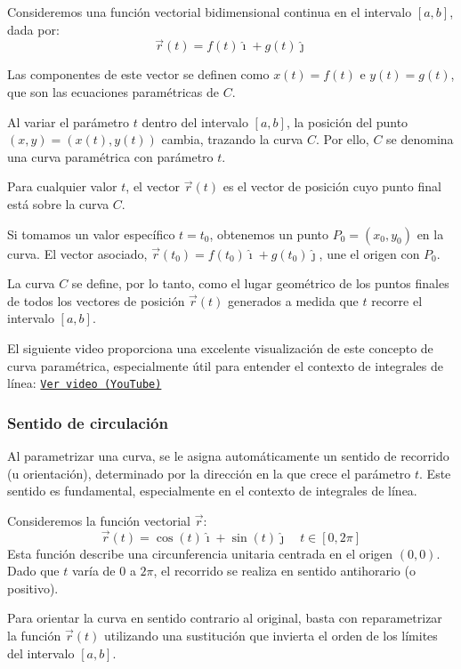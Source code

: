 Consideremos una función vectorial bidimensional continua en el intervalo $[a,b]$, dada por:
$$\vec r (t) = f(t) \hat{\imath} + g(t)\hat{\jmath}$$

Las componentes de este vector se definen como $x(t)=f(t)$ e $y(t)=g(t)$, que son las ecuaciones paramétricas de $C$.

Al variar el parámetro $t$ dentro del intervalo $[a,b]$, la posición del punto $(x,y)=(x(t),y(t))$ cambia, trazando la curva $C$. Por ello, $C$ se denomina una curva paramétrica con parámetro $t$.

Para cualquier valor $t$, el vector $\vec r(t)$ es el vector de posición cuyo punto final está sobre la curva $C$.

Si tomamos un valor específico $t=t_0$, obtenemos un punto $P_0=(x_0,y_0)$ en la curva. El vector asociado, $\vec r(t_0) = f(t_0) \hat{\imath} + g(t_0) \hat{\jmath}$, une el origen con $P_0$.

La curva $C$ se define, por lo tanto, como el lugar geométrico de los puntos finales de todos los vectores de posición $\vec r(t)$ generados a medida que $t$ recorre el intervalo $[a,b]$.

El siguiente video proporciona una excelente visualización de este concepto de curva paramétrica, especialmente útil para entender el contexto de integrales de línea: \href{[https://www.youtube.com/watch?v=wCphv9dCswg](https://www.youtube.com/watch?v=wCphv9dCswg)}{\texttt{Ver video (YouTube)}}

\subsubsection{Sentido de circulación}

Al parametrizar una curva, se le asigna automáticamente un sentido de recorrido (u orientación), determinado por la dirección en la que crece el parámetro $t$. Este sentido es fundamental, especialmente en el contexto de integrales de línea.

\begin{example}
Consideremos la función vectorial $\vec r$:
$$
\vec r(t)=\cos(t)\hat{\imath} + \sin(t)\hat{\jmath} \quad t\in[0,2\pi]
$$
Esta función describe una circunferencia unitaria centrada en el origen $(0,0)$. Dado que $t$ varía de $0$ a $2\pi$, el recorrido se realiza en sentido antihorario (o positivo).
\end{example}

Para orientar la curva en sentido contrario al original, basta con reparametrizar la función $\vec r(t)$ utilizando una sustitución que invierta el orden de los límites del intervalo $[a,b]$.

